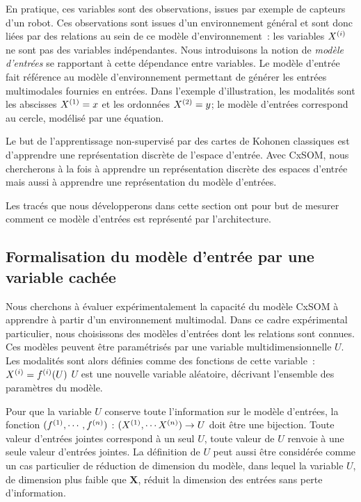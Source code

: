 \documentclass[../main]{subfiles}
\begin{document}
En pratique, ces variables sont des observations, issues par exemple de capteurs d'un robot. Ces observations sont issues d'un environnement général et sont donc liées par des relations au sein de ce modèle d'environnement~: les variables $X^{({i})}$ ne sont pas des variables indépendantes.
Nous introduisons la notion de \emph{modèle d'entrées} se rapportant à cette dépendance entre variables.
Le modèle d'entrée fait référence au modèle d'environnement permettant de générer les entrées multimodales fournies en entrées. Dans l'exemple d'illustration, les modalités sont les abscisses $X^{({1})} = x$ et les ordonnées $X^{({2})} = y$; le modèle d'entrées correspond au cercle, modélisé par une équation.

Le but de l'apprentissage non-supervisé par des cartes de Kohonen classiques est d'apprendre une représentation discrète de l'espace d'entrée.
Avec CxSOM, nous chercherons à la fois à apprendre un représentation discrète des espaces d'entrée mais aussi à apprendre une représentation du modèle d'entrées.

Les tracés que nous développerons dans cette section ont pour but de mesurer comment ce modèle d'entrées est représenté par l'architecture. 

\subsection{Formalisation du modèle d'entrée par une variable cachée}

Nous cherchons à évaluer expérimentalement la capacité du modèle CxSOM à apprendre à partir d'un environnement multimodal. Dans ce cadre expérimental particulier, nous choisissons des modèles d'entrées dont les relations sont connues.
Ces modèles peuvent être paramétrisés par une variable multidimensionnelle $U$. Les modalités sont alors définies comme des fonctions de cette variable~:
$X^{({i})} = f^{({i})}(U)$
$U$ est une nouvelle variable aléatoire, décrivant l'ensemble des paramètres du modèle.

Pour que la variable $U$ conserve toute l'information sur le modèle d'entrées, la fonction $(f^{({1})}, \cdots, f^{({n})})$ : $(X^{({1})}, \cdots X^{({n})})\rightarrow U$ doit être une bijection. Toute valeur d'entrées jointes correspond à un seul $U$, toute valeur de $U$ renvoie à une seule valeur d'entrées jointes. 
La définition de $U$ peut aussi être considérée comme un cas particulier de réduction de dimension du modèle, dans lequel la variable $U$, de dimension plus faible que $\mathbf{X}$, réduit la dimension des entrées sans perte d'information.
\end{document}
